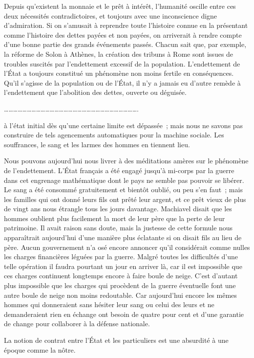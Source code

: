 \documentclass[french,twoside]{book} %
\begin{document}
Depuis qu'existent la monnaie et le prêt à intérêt, l'humanité oscille entre ces deux nécessités contradictoires, et toujours avec une inconscience digne d'admiration. Si on s'amusait à reprendre toute l'histoire connue en la présentant comme l'histoire des dettes payées et non payées, on arriverait à rendre compte d'une bonne partie des grands événements passés. Chacun sait que, par exemple, la réforme de Solon à Athènes, la création des tribuns à Rome sont issues de troubles suscités par l'endettement excessif de la population. L'endettement de l'État a toujours constitué un phénomène non moins fertile en conséquences. Qu'il s'agisse de la population ou de l'État, il n'y a jamais eu d'autre remède à l'endettement que l'abolition des dettes, ouverte ou déguisée.\par

\begin{center}
…………………………………………………………………………….\end{center}
 à l'état initial dès qu'une certaine limite est dépassée ; mais nous ne savons pas construire de tels agencements automatiques pour la machine sociale. Les souffrances, le sang et les larmes des hommes en tiennent lieu.\par
Nous pouvons aujourd'hui nous livrer à des méditations amères sur le phénomène de l'endettement. L'État français a été engagé jusqu'à mi-corps par la guerre dans cet engrenage mathématique dont le pays ne semble pas pouvoir se libérer. Le sang a été consommé gratuitement et bientôt oublié, ou peu s'en faut ; mais les familles qui ont donné leurs fils ont prêté leur argent, et ce prêt vieux de plus de vingt ans nous étrangle tous les jours davantage. Machiavel disait que les hommes oublient plus facilement la mort de leur père que la perte de leur patrimoine. Il avait raison sans doute, mais la justesse de cette formule nous apparaîtrait aujourd'hui d'une manière plus éclatante si on disait fils au lieu de père. Aucun gouvernement n'a osé encore annoncer qu'il considérait comme nulles les charges financières léguées par la guerre. Malgré toutes les difficultés d'une telle opération il faudra pourtant un jour en arriver là, car il est impossible que ces charges continuent longtemps encore à faire boule de neige. C'est d'autant plus impossible que les charges qui procèdent de la guerre éventuelle font une autre boule de neige non moins redoutable. Car aujourd'hui encore les mêmes hommes qui donneraient sans hésiter leur sang ou celui des leurs et ne demanderaient rien en échange ont besoin de quatre pour cent et d'une garantie de change pour collaborer à la défense nationale.\par
La notion de contrat entre l'État et les particuliers est une absurdité à une époque comme la nôtre.\par
\end{document}
